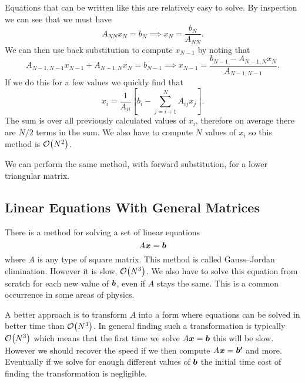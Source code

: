 \documentclass[a4paper]{article}
\begin{document}
    Equations that can be written like this are relatively easy to solve.
    By inspection we can see that we must have
    \[A_{NN}x_N = b_N \implies x_N = \frac{b_N}{A_{NN}}.\]
    We can then use back substitution to compute \(x_{N-1}\) by noting that
    \[A_{N-1,N-1} x_{N-1} + A_{N-1,N}x_N = b_{N-1} \implies x_{N-1} = \frac{b_{N-1} - A_{N-1,N}x_N}{A_{N-1,N-1}}.\]
    If we do this for a few values we quickly find that
    \[x_i = \frac{1}{A_{ii}}\left[b_i - \sum_{j=i+1}^{N} A_{ij}x_j\right].\]
    The sum is over all previously calculated values of \(x_i\), therefore on average there are \(N/2\) terms in the sum.
    We also have to compute \(N\) values of \(x_i\) so this method is \(\order{N^2}\).
    
    We can perform the same method, with forward substitution, for a lower triangular matrix.
    
    \subsection{Linear Equations With General Matrices}
    There is a method for solving a set of linear equations
    \[A\bm{x} = \bm{b}\]
    where \(A\) is any type of square matrix.
    This method is called Gauss--Jordan elimination.
    However it is slow, \(\order{N^3}\).
    We also have to solve this equation from scratch for each new value of \(\bm{b}\), even if \(A\) stays the same.
    This is a common occurrence in some areas of physics.

    A better approach is to transform \(A\) into a form where equations can be solved in better time than \(\order{N^3}\).
    In general finding such a transformation is typically \(\order{N^3}\) which means that the first time we solve \(A\bm{x} = \bm{b}\) this will be slow.
    However we should recover the speed if we then compute \(A\bm{x} = \bm{b'}\) and more.
    Eventually if we solve for enough different values of \(\bm{b}\) the initial time cost of finding the transformation is negligible.
    
\end{document}

